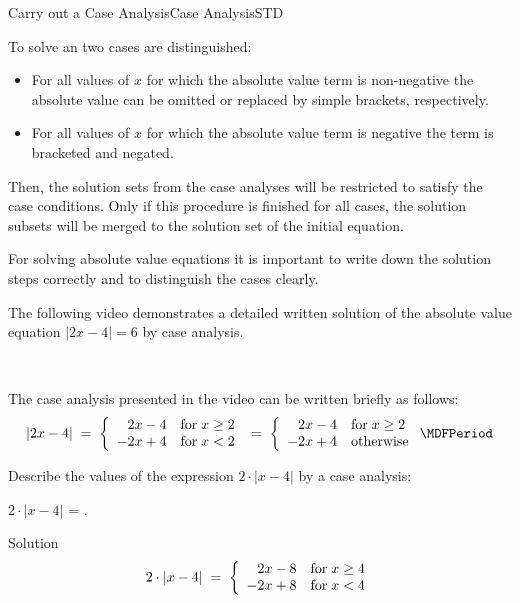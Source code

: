 \begin{MXContent}{Carry out a Case Analysis}{Case Analysis}{STD}

\begin{MInfo}
To solve an  two cases are distinguished:
\begin{itemize}
\item{For all values of $x$ for which the absolute value term is non-negative the absolute value can be omitted or
replaced by simple brackets, respectively.}
\item{For all values of $x$ for which the absolute value term is negative the term is bracketed and negated.}
\end{itemize}
Then, the solution sets from the case analyses will be restricted to satisfy the case conditions. 
Only if this procedure is finished for all cases, the solution subsets will be merged to the 
solution set of the initial equation. 
\end{MInfo}

For solving absolute value equations it is important to write down the solution steps correctly
and to distinguish the cases clearly.

The following video demonstrates a detailed written solution of the absolute value
equation $|2x-4|=6$ by case analysis.


\ \\

The case analysis presented in the video can be written briefly as follows:
$$
|2x-4| \;=\; \MCases{2x-4 &\text{for}\;x\geq 2 \\ -2x+4 & \text{for}\;x<2} \;=\;\MCases{2x-4 &\text{for}\;x\geq 2 \\ -2x+4 & \text{otherwise}} \MDFPeriod
$$

\begin{MExercise}
Describe the values of the expression $2\cdot |x-4|$ by a case analysis:
\begin{center}
$\displaystyle 2\cdot |x-4|$ = .
\end{center}
\begin{MHint}{Solution}
\begin{eqnarray*}
2\cdot |x-4| \;=\; \left\lbrace{\begin{array}{rl} 2x-8 &\text{for}\;x\geq 4 \\ -2x+8 & \text{for}\;x<4 \end{array}}\right.
\end{eqnarray*}
\end{MHint}
\end{MExercise}


\end{MXContent}
